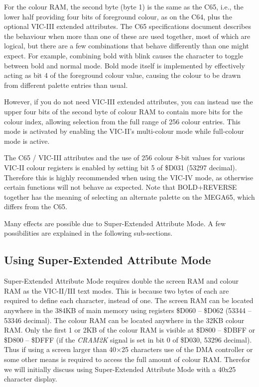 For the colour RAM, the second byte (byte 1) is the same as the C65, i.e., the lower half providing four bits of foreground colour, as on the C64, plus the optional VIC-III extended attributes. The C65 specifications document describes the behaviour when more than one of these are used together, most of which are logical, but there are a few combinations that behave differently than one might expect. For example, combining bold with blink causes the character to toggle between bold and normal mode. Bold mode itself is implemented by effectively acting as bit 4 of the foreground colour value, causing the colour to be drawn from different palette entries than usual.

However, if you do not need VIC-III extended attributes, you can instead use the upper four bits of the second byte of colour RAM to contain more bits for the colour index, allowing selection from the full range of 256 colour entries.  This mode is activated by enabling the VIC-II's multi-colour mode while full-colour mode is active.

The C65 / VIC-III attributes and the use of 256 colour 8-bit values for various VIC-II colour registers is enabled by setting bit 5 of \$D031 (53297 decimal).  Therefore this is highly recommended when using the VIC-IV mode, as otherwise certain functions will not behave as expected. Note that BOLD+REVERSE together has the meaning of selecting an alternate palette on the MEGA65, which differs from the C65.

Many effects are possible due to Super-Extended Attribute Mode.  A few possibilities are explained in the following sub-sections.

\subsection{Using Super-Extended Attribute Mode}

Super-Extended Attribute Mode requires double the screen RAM and colour RAM as the VIC-II/III text modes. This is because two bytes of each are required to define each character, instead of one.  The screen RAM can be located anywhere in the 384KB of main memory using registers \$D060 -- \$D062 (53344 -- 53346 decimal).  The colour RAM can be located anywhere in the 32KB colour RAM.  Only the first 1 or 2KB of the colour RAM is visible at \$D800 -- \$DBFF or \$D800 -- \$DFFF (if the {\em CRAM2K} signal is set in bit 0 of \$D030, 53296 decimal).  Thus if using a screen larger than 40$\times$25 characters use of the DMA controller or some other means is required to access the full amount of colour RAM.  Therefor we will initially discuss using Super-Extended Attribute Mode with a 40x25 character display.

